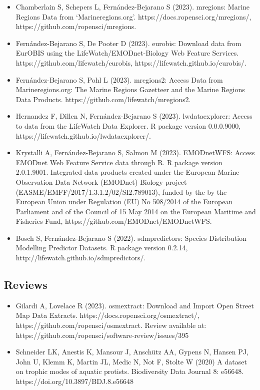 \documentclass[
  16,
]{article}
\providecommand{\tightlist}{%
  \setlength{\itemsep}{0pt}\setlength{\parskip}{0pt}}\usepackage{longtable,booktabs,array}
\begin{document}
\begin{itemize}
\tightlist
\item
  Chamberlain S, Schepers L, Fernández-Bejarano S (2023). mregions:
  Marine Regions Data from `Marineregions.org'.
  https://docs.ropensci.org/mregions/,
  https://github.com/ropensci/mregions.
\item
  Fernández-Bejarano S, De Pooter D (2023). eurobis: Download data from
  EurOBIS using the LifeWatch/EMODnet-Biology Web Feature Services.
  https://github.com/lifewatch/eurobis,
  https://lifewatch.github.io/eurobis/.
\item
  Fernández-Bejarano S, Pohl L (2023). mregions2: Access Data from
  Marineregions.org: The Marine Regions Gazetteer and the Marine Regions
  Data Products. https://github.com/lifewatch/mregions2.
\item
  Hernandez F, Dillen N, Fernández-Bejarano S (2023). lwdataexplorer:
  Access to data from the LifeWatch Data Explorer. R package version
  0.0.0.9000, https://lifewatch.github.io/lwdataexplorer/.
\item
  Krystalli A, Fernández-Bejarano S, Salmon M (2023). EMODnetWFS: Access
  EMODnet Web Feature Service data through R. R package version
  2.0.1.9001. Integrated data products created under the European Marine
  Observation Data Network (EMODnet) Biology project
  (EASME/EMFF/2017/1.3.1.2/02/SI2.789013), funded by the by the European
  Union under Regulation (EU) No 508/2014 of the European Parliament and
  of the Council of 15 May 2014 on the European Maritime and Fisheries
  Fund, https://github.com/EMODnet/EMODnetWFS.
\item
  Bosch S, Fernández-Bejarano S (2022). sdmpredictors: Species
  Distribution Modelling Predictor Datasets. R package version 0.2.14,
  http://lifewatch.github.io/sdmpredictors/.
\end{itemize}

\hypertarget{reviews}{%
\subsection{Reviews}\label{reviews}}

\begin{itemize}
\tightlist
\item
  Gilardi A, Lovelace R (2023). osmextract: Download and Import Open
  Street Map Data Extracts. https://docs.ropensci.org/osmextract/,
  https://github.com/ropensci/osmextract. Review available at:
  https://github.com/ropensci/software-review/issues/395
\item
  Schneider LK, Anestis K, Mansour J, Anschütz AA, Gypens N, Hansen PJ,
  John U, Klemm K, Martin JL, Medic N, Not F, Stolte W (2020) A dataset
  on trophic modes of aquatic protists. Biodiversity Data Journal 8:
  e56648. https://doi.org/10.3897/BDJ.8.e56648
\end{itemize}
\end{document}
